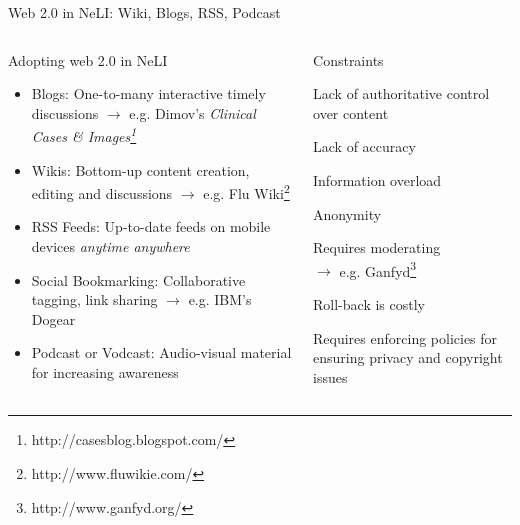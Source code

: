 \documentclass{beamer}
\begin{document}
\begin{frame}[t]{Web 2.0 in NeLI: Wiki, Blogs, RSS, Podcast}
\begin{columns}
\begin{block}{Adopting web 2.0 in NeLI}
\begin{itemize}
\item \alert{Blogs:} \small One-to-many interactive timely discussions %
$\rightarrow$ \scriptsize e.g. Dimov's \textit{Clinical Cases \& Images\footnote{\scriptsize http://casesblog.blogspot.com/}}
\item \small \alert{Wikis:} Bottom-up content creation, editing and discussions %
$\rightarrow$ \scriptsize e.g. Flu Wiki\footnote{\scriptsize http://www.fluwikie.com/}
\item \small \alert{RSS Feeds:} Up-to-date feeds on mobile devices \textit{anytime anywhere}
\item \small \alert{Social Bookmarking:} Collaborative tagging, link sharing %
$\rightarrow$ \scriptsize e.g. IBM's Dogear%
\item \small \alert{Podcast or Vodcast:} Audio-visual material for increasing awareness
\end{itemize}
\end{block}
%
\begin{block}{Constraints}
\begin{itemize}
\begin{small}
\item  Lack of \alert{authoritative control} over content \item  Lack of \alert{accuracy} 
\item  Information \alert{overload}
\item  \alert{Anonymity} %
\item Requires \alert{moderating}\\ 
$\rightarrow$  \scriptsize e.g. Ganfyd\footnote{\scriptsize  http://www.ganfyd.org/}
\item  \small \alert{Roll-back} is costly\\
\item  Requires enforcing policies for ensuring \alert{privacy and copyright} issues
\end{small}
\end{itemize}
\end{block}
\end{columns}  	
\end{frame}
\end{document}
